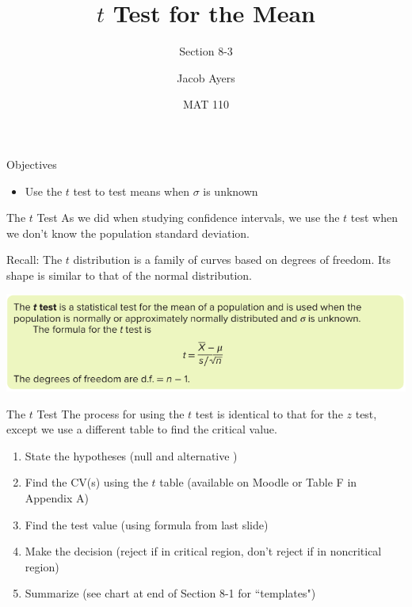 \documentclass[t, aspectratio=169]{beamer}
\title[8-3]{$t$ Test for the Mean}
\subtitle{Section 8-3}
\author{Jacob Ayers}
\institute{Lesson \#26}
\date{MAT 110}
\newcommand{\?}{\stackrel{?}{=}}
\begin{document}
	
	\begin{frame}
		\titlepage
	\end{frame}
	
	\begin{frame}{Objectives}
		\begin{itemize}
			\item Use the $t$ test to test means when $\sigma$ is unknown
		\end{itemize}
	\end{frame}

	\begin{frame}{The $t$ Test}
		As we did when studying confidence intervals, we use the $t$ test when we don't know the population standard deviation. \pause
		
		Recall: The $t$ distribution is a family of curves based on degrees of freedom. Its shape is similar to that of the normal distribution. \pause
		
		\includegraphics[width=\textwidth]{t-test-stat.png}
	\end{frame}

	\begin{frame}{The $t$ Test}
		The process for using the $t$ test is identical to that for the $z$ test, except we use a different table to find the critical value. \pause \begin{enumerate}[1)]
			\item State the hypotheses (null and alternative \pause)
			\item Find the CV(s) using the $t$ table (available on Moodle or Table F in Appendix A) \pause
			\item Find the test value (using formula from last slide) \pause
			\item Make the decision (reject if in critical region, don't reject if in noncritical region) \pause
			\item Summarize (see chart at end of Section 8-1 for ``templates")
		\end{enumerate}
	\end{frame}
\end{document}
